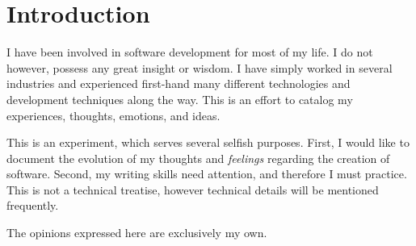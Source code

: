 \section{Introduction}
I have been involved in software development for most of my life. I do
not however, possess any great insight or wisdom. I have simply worked
in several industries and experienced first-hand many different
technologies and development techniques along the way. This is an
effort to catalog my experiences, thoughts, emotions, and ideas.

This is an experiment, which serves several selfish purposes. First, I
would like to document the evolution of my thoughts and
\emph{feelings} regarding the creation of software. Second, my writing
skills need attention, and therefore I must practice. This is not a technical
treatise, however technical details will be mentioned frequently.

The opinions expressed here are exclusively my own. 




